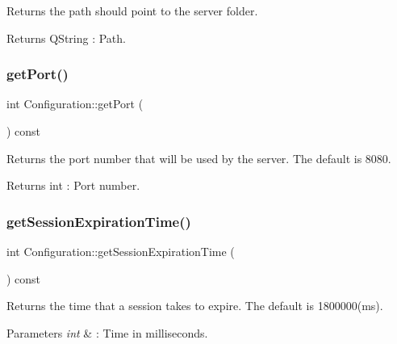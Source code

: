 Returns the path should point to the server folder. 

\begin{DoxyReturn}{Returns}
Q\+String \+: Path. 
\end{DoxyReturn}
\mbox{\label{class_configuration_ab34eb25aa1e175c7ac8323300b298a8a}} 
\subsubsection{\texorpdfstring{get\+Port()}{getPort()}}
{\footnotesize\ttfamily int Configuration\+::get\+Port (\begin{DoxyParamCaption}{ }\end{DoxyParamCaption}) const}



Returns the port number that will be used by the server. The default is 8080. 

\begin{DoxyReturn}{Returns}
int \+: Port number. 
\end{DoxyReturn}
\mbox{\label{class_configuration_af14b4f22fdcdfc32fbcac712a9868fd4}} 
\subsubsection{\texorpdfstring{get\+Session\+Expiration\+Time()}{getSessionExpirationTime()}}
{\footnotesize\ttfamily int Configuration\+::get\+Session\+Expiration\+Time (\begin{DoxyParamCaption}{ }\end{DoxyParamCaption}) const}



Returns the time that a session takes to expire. The default is 1800000(ms). 


\begin{DoxyParams}{Parameters}
{\em int} & \+: Time in milliseconds. \\
\hline
\end{DoxyParams}
\mbox{\label{class_configuration_a10405dacfb3b61f60b290c0a5d79a8fb}} 
